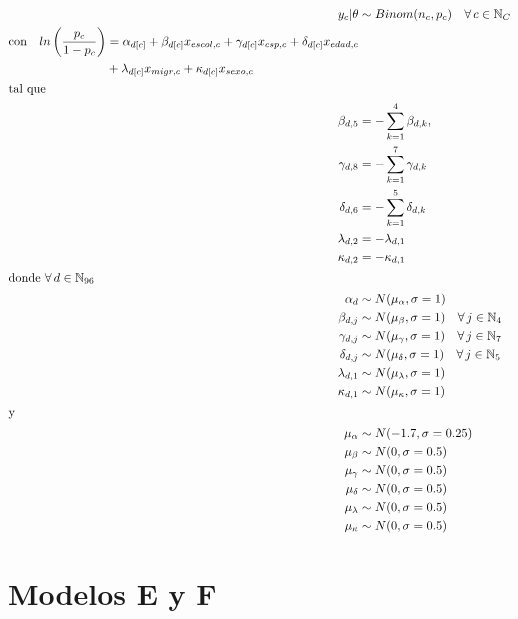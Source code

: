 \begin{align}\label{eq:Modelo_Comp_D}
y_c|\theta & \sim Binom(n_c,p_c) \quad \forall \, c \in \mathbb{N}_C \nonumber \\
\begin{split}
\text{con} \quad ln\left(\dfrac{p_c}{1-p_c}\right) &= \alpha_{d[c]} + \beta_{d[c]} x_{escol,c} + \gamma_{d[c]} x_{csp,c} + \delta_{d[c]} x_{edad,c} \\
&+ \lambda_{d[c]} x_{migr,c} + \kappa_{d[c]} x_{sexo,c} 
\end{split}\\
\intertext{tal que} 
\beta_{d,5} &= -\sum\limits_{k = 1}^{4} \beta_{d,k}, \nonumber \\
\gamma_{d,8} &= -\sum\limits_{k = 1}^{7} \gamma_{d,k} \nonumber \\
\delta_{d,6} &= -\sum\limits_{k = 1}^{5} \delta_{d,k} \nonumber \\
\lambda_{d,2} &= -\lambda_{d,1} \nonumber \\
\kappa_{d,2} &= -\kappa_{d,1} \nonumber \\
\intertext{donde $\forall \, d \in \mathbb{N}_{96}$}
\alpha_d & \sim N(\mu_{\alpha}, \sigma=1) \quad  \nonumber \\
\beta_{d,j} & \sim N(\mu_{\beta}, \sigma=1) \quad \forall \, j \in \mathbb{N}_{4} \nonumber \\
\gamma_{d,j} & \sim N(\mu_{\gamma}, \sigma=1) \quad \forall \, j \in \mathbb{N}_{7} \nonumber \\
\delta_{d,j} & \sim N(\mu_{\delta}, \sigma=1) \quad \forall \, j \in \mathbb{N}_{5} \nonumber \\
\lambda_{d,1} & \sim N(\mu_{\lambda}, \sigma=1) \nonumber \\
\kappa_{d,1} & \sim N(\mu_{\kappa}, \sigma=1) \nonumber \\
\intertext{y}
\mu_{\alpha} &\sim N(-1.7,\sigma=0.25) \nonumber \\
\mu_{\beta} &\sim N(0,\sigma=0.5) \nonumber \\
\mu_{\gamma} &\sim N(0,\sigma=0.5) \nonumber \\
\mu_{\delta} &\sim N(0,\sigma=0.5) \nonumber \\
\mu_{\lambda} &\sim N(0,\sigma=0.5) \nonumber \\
\mu_{\kappa} &\sim N(0,\sigma=0.5) \nonumber
\end{align}

\section*{Modelos E y F}


